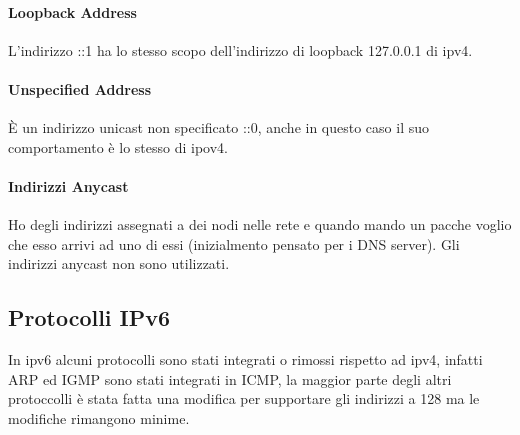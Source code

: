 \documentclass[12pt]{article}
\begin{document}
\paragraph{Loopback Address}
L'indirizzo ::1 ha lo stesso scopo dell'indirizzo di loopback 127.0.0.1 di ipv4.

\paragraph{Unspecified Address}
\`E un indirizzo unicast non specificato ::0, anche in questo caso il suo comportamento \`e lo stesso di ipov4.


\paragraph{Indirizzi Anycast}
Ho degli indirizzi assegnati a dei nodi nelle rete e quando mando un pacche voglio che esso arrivi ad uno di essi (inizialmento pensato per i DNS server). Gli indirizzi anycast non sono utilizzati.


\newpage
\subsection{Protocolli IPv6}
In ipv6 alcuni protocolli sono stati integrati o rimossi rispetto ad ipv4, infatti ARP ed IGMP sono stati integrati in ICMP, la maggior parte degli altri protoccolli \`e stata fatta una modifica per supportare gli indirizzi a 128 ma le modifiche rimangono minime.
\end{document}
